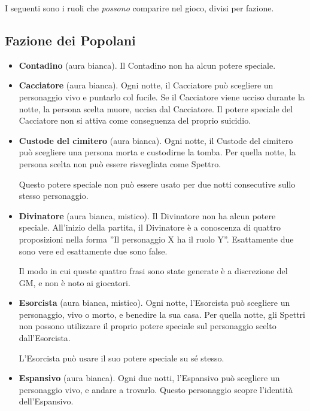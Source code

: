 \documentclass[a4paper,10pt]{article}
\begin{document}
I seguenti sono i ruoli che \emph{possono} comparire nel gioco, divisi per fazione.


\subsection*{Fazione dei Popolani}

\begin{itemize}
 \item {\bf Contadino} (aura bianca). Il Contadino non ha alcun potere speciale.

 \item {\bf Cacciatore} (aura bianca). Ogni notte, il Cacciatore può scegliere un personaggio vivo e puntarlo col fucile. Se il Cacciatore viene ucciso durante la notte, la persona scelta muore, uccisa dal Cacciatore.
 Il potere speciale del Cacciatore non si attiva come conseguenza del proprio suicidio.
 
 \item {\bf Custode del cimitero} (aura bianca). Ogni notte, il Custode del cimitero può scegliere una persona morta e custodirne la tomba. Per quella notte, la persona scelta non può essere risvegliata come Spettro.
 
 Questo potere speciale non può essere usato per due notti consecutive sullo stesso personaggio.

 \item {\bf Divinatore} (aura bianca, mistico). Il Divinatore non ha alcun potere speciale. All'inizio della partita, il Divinatore è a conoscenza di quattro proposizioni nella forma ''Il personaggio X ha il ruolo Y''. Esattamente due sono vere ed esattamente due sono false.
 
 Il modo in cui queste quattro frasi sono state generate è a discrezione del GM, e non è noto ai giocatori.

 \item {\bf Esorcista} (aura bianca, mistico). Ogni notte, l'Esorcista può scegliere un personaggio, vivo o morto, e benedire la sua casa.
 Per quella notte, gli Spettri non possono utilizzare il proprio potere speciale sul personaggio scelto dall'Esorcista.
 
 L'Esorcista può usare il suo potere speciale su sé stesso.
 
 \item {\bf Espansivo} (aura bianca). Ogni due notti, l'Espansivo può scegliere un personaggio vivo, e andare a trovarlo. Questo personaggio scopre l'identità dell'Espansivo.


\end{itemize}
\end{document}
